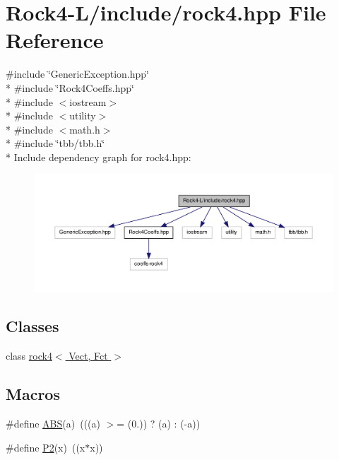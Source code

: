 \hypertarget{Rock4-L_2include_2rock4_8hpp}{\section{Rock4-\/\-L/include/rock4.hpp File Reference}
\label{Rock4-L_2include_2rock4_8hpp}
}
{\ttfamily \#include \char`\"{}Generic\-Exception.\-hpp\char`\"{}}\\*
{\ttfamily \#include \char`\"{}Rock4\-Coeffs.\-hpp\char`\"{}}\\*
{\ttfamily \#include $<$iostream$>$}\\*
{\ttfamily \#include $<$utility$>$}\\*
{\ttfamily \#include $<$math.\-h$>$}\\*
{\ttfamily \#include \char`\"{}tbb/tbb.\-h\char`\"{}}\\*
Include dependency graph for rock4.\-hpp\-:
\nopagebreak
\begin{figure}[H]
\begin{center}
\leavevmode
\includegraphics[width=350pt]{Rock4-L_2include_2rock4_8hpp__incl}
\end{center}
\end{figure}
\subsection*{Classes}
\begin{DoxyCompactItemize}
\item 
class \hyperlink{classrock4}{rock4$<$ Vect, Fct $>$}
\end{DoxyCompactItemize}
\subsection*{Macros}
\begin{DoxyCompactItemize}
\item 
\#define \hyperlink{Rock4-L_2include_2rock4_8hpp_ae2f08dc603ae93c402abd918ba4e23e1}{A\-B\-S}(a)~(((a) $>$= (0.)) ? (a) \-: (-\/a))
\item 
\#define \hyperlink{Rock4-L_2include_2rock4_8hpp_a90d9b1cbee01087dc9688be31c49bfc6}{P2}(x)~((x$\ast$x))
\end{DoxyCompactItemize}


